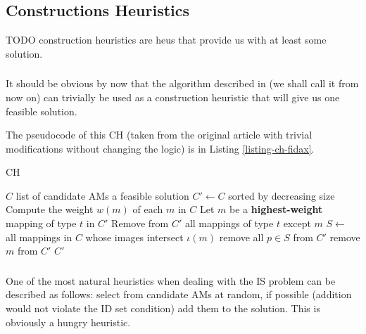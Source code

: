 \subsection{Constructions Heuristics}

TODO construction heuristics are heus that provide us with at least some solution.

\subsubsection{}

It should be obvious by now that the algorithm described in \cite{fidax} (we shall call it  from now on) can trivially be used as a construction heuristic that will give us one feasible solution.

The pseudocode of this CH (taken from the original article with trivial modifications without changing the logic) is in Listing \ref{listing-ch-fidax}.

\begin{algorithm}
\caption{ CH}
\label{listing-ch-fidax}
\begin{algorithmic}
\REQUIRE $C$ list of candidate AMs
\ENSURE a feasible solution
\STATE $C' \gets C$ sorted by decreasing size
\STATE Compute the weight $w(m)$ of each $m$ in $C$
  \STATE Let $m$ be a \textbf{highest-weight} mapping of type $t$ in $C'$
  \STATE Remove from $C'$ all mappings of type $t$ except $m$
\ENDFOR
{}
  \STATE $S \gets$ all mappings in $C$ whose images intersect $\iota(m)$
    \STATE remove all $p \in S$ from $C'$
  \ELSE
    \STATE remove $m$ from $C'$
  \ENDIF
\ENDFOR
\RETURN $C'$
\end{algorithmic}
\end{algorithm}

\subsubsection{}
\label{heu-ch-random}

One of the most natural heuristics when dealing with the IS problem can be described as follows: select from candidate AMs at random, if possible (addition would not violate the ID set condition) add them to the solution. This is obviously a hungry heuristic. %

